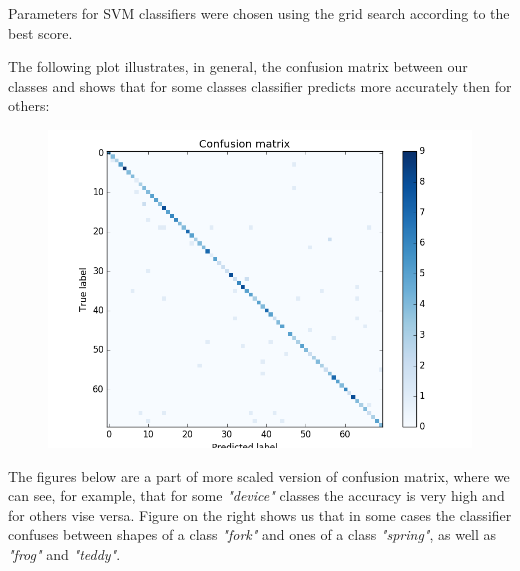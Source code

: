 \documentclass[12pt]{article}
\begin{document}
Parameters for SVM classifiers were chosen using the grid search according to the best score.

The following plot illustrates, in general, the confusion matrix between our classes and shows that for some classes classifier predicts more accurately then for others:

\begin{figure}
  \begin{center}
    \includegraphics[scale=0.6]{confusion_matrix.png} 
  \end{center}
\end{figure}

The figures below are a part of more scaled version of confusion matrix, where we can see, for example, that for some \textit{"device"} classes the accuracy is very high and for others vise versa. Figure on the right shows us that in some cases the classifier confuses between shapes of a class \textit{"fork"} and ones of a class \textit{"spring"}, as well as \textit{"frog"} and \textit{"teddy"}.   
\end{document}
